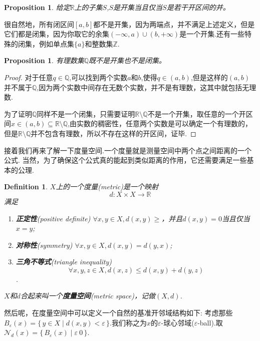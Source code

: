 \documentclass{article}
\newtheorem{proposition}[theorem]{Proposition}
\newtheorem{definition}[theorem]{Definition}
\newcommand*{\xfunc}[4]{{#2}\colon{#3}{#1}{#4}}
\newcommand*{\func}[3]{\xfunc{\to}{#1}{#2}{#3}}
\newcommand\Set[2]{\{\,#1\mid#2\,\}} %
\begin{document}
\begin{proposition}
给定$\mathbb{R}$上的子集$S$,$S$是开集当且仅当$S$是若干开区间的并。
\end{proposition}

很自然地，所有闭区间$[a,b]$都不是开集，因为两端点，并不满足上述定义，但是它们都是闭集，因为你取它的余集$(-\infty,a) \cup (b,+\infty)$是一个开集.还有一些特殊的闭集，例如单点集$\{a\}$和整数集$\mathbb{Z}$.

\begin{proposition}
有理数集$\mathbb{Q}$既不是开集也不是闭集。
\end{proposition}

\begin{proof}
对于任意$q \in \mathbb{Q}$,可以找到两个实数$a$和$b$,使得$q \in (a,b)$,但是这样的$(a,b)$并不属于$\mathbb{Q}$,因为两个实数中间存在无数个实数，并不是有理数，这其中就包括无理数.

为了证明$\mathbb{Q}$同样不是一个闭集，只需要证明$\mathbb{R} \setminus \mathbb{Q}$不是一个开集，取任意的一个开区间$x \in (a,b) \subseteq \mathbb{R} \setminus \mathbb{Q}$,由实数的稠密性，任意两个实数是可以确定一个有理数的，但是$\mathbb{R} \setminus \mathbb{Q}$并不包含有理数，所以不存在这样的开区间，证毕.
\end{proof}

接着我们再来了解一下度量空间.一个度量就是测量空间中两个点之间距离的一个公式. 当然，为了确保这个公式真的能起到类似距离的作用，它还需要满足一些基本的公理.

\begin{definition}
$X$上的一个度量(metric)是一个映射\[\func{d}{X \times X}{\mathbb{R}}\]满足
\begin{enumerate}
	\item \textbf{正定性}(positive definite) $\forall x,y \in X,d(x,y) \geq$，并且$d(x,y)=0$当且仅当$x=y$;
	\item \textbf{对称性}(symmetry) $\forall x,y \in X,d(x,y)=d(y,x)$;
	\item \textbf{三角不等式}(triangle inequality) \[\forall x,y,z \in X,d(x,z) \leq d(x,y)+d(y,z)\].
\end{enumerate}
$X$和$d$合起来叫一个\textbf{度量空间}(metric space)，记做$(X,d)$.
\end{definition}

然后呢，在度量空间中可以定义一个自然的基准开邻域结构如下: 考虑那些$B_{\varepsilon}(x)=\Set{y \in X}{d(x,y) < \varepsilon}$.我们称之为$x$的$\varepsilon$-球心邻域($\varepsilon$-ball).取$\mathcal{N}_d(x)=\Set{B_{\varepsilon}(x)}{\varepsilon \> 0}$.
\end{document}
